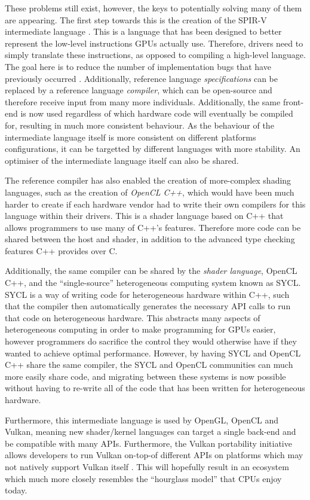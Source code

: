 \documentclass[a4paper,12pt,twoside,openright]{report}
\begin{document}
These problems still exist, however, the keys to potentially solving many of
them are appearing. The first step towards this is the creation of the SPIR-V
intermediate language \cite{SPIRV}. This is a language that has been designed
to better represent the low-level instructions GPUs actually use. Therefore,
drivers need to simply translate these instructions, as opposed to compiling a
high-level language. The goal here is to reduce the number of implementation
bugs that have previously occurred \cite{TODO}. Additionally, reference
language \textit{specifications} can be replaced by a reference language
\textit{compiler}, which can be open-source and therefore receive input from
many more individuals. Additionally, the same front-end is now used regardless
of which hardware code will eventually be compiled for, resulting in much more
consistent behaviour. As the behaviour of the intermediate language itself is
more consistent on different platforms configurations, it can be targetted by
different languages with more stability. An optimiser of the intermediate
language itself can also be shared.

The reference compiler has also enabled the creation of more-complex shading
languages, such as the creation of \textit{OpenCL C++}, which would have been
much harder to create if each hardware vendor had to write their own compilers
for this language within their drivers. This is a shader language based on C++
that allows programmers to use many of C++'s features. Therefore more code can
be shared between the host and shader, in addition to the advanced type
checking features C++ provides over C.

Additionally, the same compiler can be shared by the \textit{shader language},
OpenCL C++, and the ``single-source'' heterogeneous computing system known as
SYCL. SYCL is a way of writing code for heterogeneous hardware within C++, such
that the compiler then automatically generates the necessary API calls to run
that code on heterogeneous hardware. This abstracts many aspects of
heterogeneous computing in order to make programming for GPUs easier, however
programmers do sacrifice the control they would otherwise have if they wanted
to achieve optimal performance. However, by having SYCL and OpenCL C++ share
the same compiler, the SYCL and OpenCL communities can much more easily share
code, and migrating between these systems is now possible without having to
re-write all of the code that has been written for heterogeneous hardware.

Furthermore, this intermediate language is used by OpenGL, OpenCL and Vulkan,
meaning new shader/kernel languages can target a single back-end and be
compatible with many APIs. Furthermore, the Vulkan portability initiative
allows developers to run Vulkan on-top-of different APIs on platforms which may
not natively support Vulkan itself \cite{TODO}. This will hopefully result in
an ecosystem which much more closely resembles the ``hourglass model'' that
CPUs enjoy today.
\end{document}
